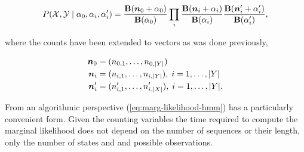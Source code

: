 \documentclass[12pt]{report}
\newcommand{\p}[0]{\prime}
\newcommand{\1}[0]{\mathbbm{1}}
\newcommand{\Bf}[0]{\text{\textbf{B}}}
\DeclarePairedDelimiter\abs{\lvert}{\rvert}%
\begin{document}
\begin{equation}
    P(\mathcal{X}, \mathcal{Y} \mid \alpha_0, \alpha_i, \alpha_i^\prime)
    = \frac{\Bf(\bm{n}_0 + \alpha_0)}{\Bf(\alpha_0)}
    \prod_i \frac{\Bf(\bm{n}_i + \alpha_i)}{\Bf(\alpha_i)}
    \frac{\Bf(\bm{n}_i^\p + \alpha_i^\p)}{\Bf(\alpha_i^\p)},
    \label{eq:marg-likelihood-hmm}
\end{equation}

where the counts have been extended to vectors as was done previously,

\begin{align*}
    \bm{n}_0 &= (n_{0,1}, \ldots, n_{0,\abs{Y}}) \\
    \bm{n}_i &= (n_{i,1}, \ldots, n_{i,\abs{Y}}),\; i = 1, \ldots, \abs{Y} \\
    \bm{n}_i^\p &= (n_{i,1}^\p, \ldots, n_{i,\abs{X}}^\p),\; i = 1, \ldots, \abs{Y}. \\
\end{align*}

From an algorithmic perspective (\ref{eq:marg-likelihood-hmm}) has a particularly convenient
form. Given the counting variables the time required to compute the marginal likelihood does not
depend on the number of sequences or their length, only the number of states and and possible observations.
\end{document}
